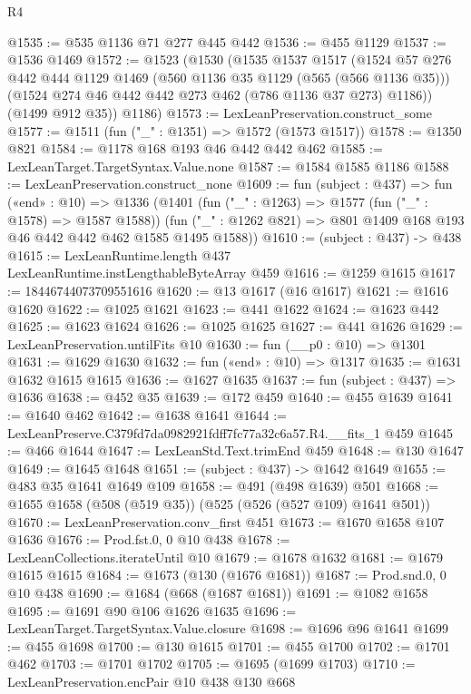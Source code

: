 \begin{lexlean}{R4}
\begin{coremodule}
@1535 := @535 @1136 @71 @277 @445 @442
@1536 := @455 @1129
@1537 := @1536 @1469
@1572 := @1523
    (@1530
      (@1535
        @1537
        @1517
        (@1524
          @57
          @276
          @442
          @444
          @1129
          @1469
          (@560 @1136 @35 @1129 (@565 (@566 @1136 @35)))
          (@1524 @274 @46 @442 @442 @273 @462 (@786 @1136 @37 @273) @1186))
        (@1499 @912 @35))
      @1186)
@1573 := LexLeanPreservation.construct_some
@1577 := @1511 (fun ("_" : @1351) => @1572 (@1573 @1517))
@1578 := @1350 @821
@1584 := @1178 @168 @193 @46 @442 @442 @462
@1585 := LexLeanTarget.TargetSyntax.Value.none
@1587 := @1584 @1585 @1186
@1588 := LexLeanPreservation.construct_none
@1609 := fun (subject : @437) =>
  fun («end» : @10) =>
  @1336
    (@1401
      (fun ("_" : @1263) => @1577 (fun ("_" : @1578) => @1587 @1588))
      (fun ("_" : @1262 @821) => @801 @1409 @168 @193 @46 @442 @442 @462 @1585 @1495 @1588))
@1610 := (subject : @437) -> @438
@1615 := LexLeanRuntime.length @437 LexLeanRuntime.instLengthableByteArray @459
@1616 := @1259 @1615
@1617 := 18446744073709551616
@1620 := @13 @1617 (@16 @1617)
@1621 := @1616 @1620
@1622 := @1025 @1621
@1623 := @441 @1622
@1624 := @1623 @442
@1625 := @1623 @1624
@1626 := @1025 @1625
@1627 := @441 @1626
@1629 := LexLeanPreservation.untilFits @10
@1630 := fun (__p0 : @10) => @1301
@1631 := @1629 @1630
@1632 := fun («end» : @10) => @1317
@1635 := @1631 @1632 @1615 @1615
@1636 := @1627 @1635
@1637 := fun (subject : @437) => @1636
@1638 := @452 @35
@1639 := @172 @459
@1640 := @455 @1639
@1641 := @1640 @462
@1642 := @1638 @1641
@1644 := LexLeanPreserve.C379fd7da0982921fdff7fc77a32c6a57.R4.__fits_1 @459
@1645 := @466 @1644
@1647 := LexLeanStd.Text.trimEnd @459
@1648 := @130 @1647
@1649 := @1645 @1648
@1651 := (subject : @437) -> @1642 @1649
@1655 := @483 @35 @1641 @1649 @109
@1658 := @491 (@498 @1639) @501
@1668 := @1655 @1658 (@508 (@519 @35)) (@525 (@526 (@527 @109) @1641 @501))
@1670 := LexLeanPreservation.conv_first @451
@1673 := @1670 @1658 @107 @1636
@1676 := Prod.fst.{0, 0} @10 @438
@1678 := LexLeanCollections.iterateUntil @10
@1679 := @1678 @1632
@1681 := @1679 @1615 @1615
@1684 := @1673 (@130 (@1676 @1681))
@1687 := Prod.snd.{0, 0} @10 @438
@1690 := @1684 (@668 (@1687 @1681))
@1691 := @1082 @1658
@1695 := @1691 @90 @106 @1626 @1635
@1696 := LexLeanTarget.TargetSyntax.Value.closure
@1698 := @1696 @96 @1641
@1699 := @455 @1698
@1700 := @130 @1615
@1701 := @455 @1700
@1702 := @1701 @462
@1703 := @1701 @1702
@1705 := @1695 (@1699 @1703)
@1710 := LexLeanPreservation.encPair @10 @438 @130 @668

\end{coremodule}
\end{lexlean}
